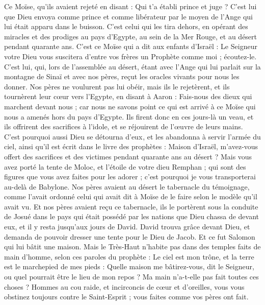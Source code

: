 \begin{multicols}{2}
Ce Moïse, qu’ils avaient rejeté en disant : Qui t'a établi prince et juge ? C’est lui que Dieu envoya comme prince et comme libérateur par le moyen de l'Ange qui lui était apparu dans le buisson.
C'est celui qui les tira dehors, en opérant des miracles et des prodiges au pays d’Egypte, au sein de la Mer Rouge, et au désert pendant quarante ans.
C'est ce Moïse qui a dit aux enfants d'Israël : Le Seigneur votre Dieu vous suscitera d'entre vos frères un Prophète comme moi ; écoutez-le.
C'est lui, qui, lors de l'assemblée au désert, étant avec l'Ange qui lui parlait sur la montagne de Sinaï et avec nos pères, reçut les oracles vivants pour nous les donner.
Nos pères ne voulurent pas lui obéir, mais ils le rejetèrent, et ils tournèrent leur cœur vers l’Egypte,
en disant à Aaron : Fais-nous des dieux qui marchent devant nous ; car nous ne savons point ce qui est arrivé à ce Moïse qui nous a amenés hors du pays d'Egypte.
Ils firent donc en ces jours-là un veau, et ils offrirent des sacrifices à l'idole, et se réjouirent de l’œuvre de leurs mains.
C’est pourquoi aussi Dieu se détourna {d’eux }, et les abandonna à servir l’armée du ciel, ainsi qu'il est écrit dans le livre des prophètes : Maison d'Israël, m'avez-vous offert des sacrifices et des victimes pendant quarante ans au désert ?
Mais vous avez porté la tente de Moloc, et l'étoile de votre dieu Remphan ; qui sont des figures que vous avez faites pour les adorer ; c'est pourquoi je vous transporterai au-delà de Babylone.
Nos pères avaient au désert le tabernacle du témoignage, comme l’avait ordonné celui qui avait dit à Moïse de le faire selon le modèle qu'il avait vu.
Et nos pères avaient reçu ce tabernacle, ils le portèrent sous la conduite de Josué dans le pays qui était possédé par les nations que Dieu chassa de devant eux, et il y resta jusqu'aux jours de David.
David trouva grâce devant Dieu, et demanda de pouvoir dresser une tente pour le Dieu de Jacob.
Et ce fut Salomon qui lui bâtit une maison.
Mais le Très-Haut n'habite pas dans des temples faits de main d’homme, selon ces paroles du prophète :
Le ciel est mon trône, et la terre est le marchepied de mes pieds : Quelle maison me bâtirez-vous, dit le Seigneur, ou quel pourrait être le lieu de mon repos ?
Ma main n'a-t-elle pas fait toutes ces choses ?
Hommes au cou raide, et incirconcis de cœur et d'oreilles, vous vous obstinez toujours contre le Saint-Esprit ; vous faites comme vos pères ont fait.

\end{multicols}

